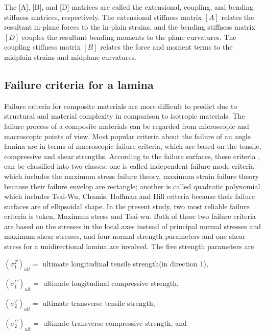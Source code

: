 The [A], [B], and [D] matrices are called the extensional, coupling, and bending stiffness matrices,
respectively. The extensional stiffness matrix $[A]$ relates the resultant in-plane forces to the
in-plain strains, and the bending stiffness matrix $[D]$ couples the resultant bending moments to
the plane curvatures.  The coupling stiffness matrix $[B]$ relates the force and moment terms to the
midplain strains and midplane curvatures.

\subsection{Failure criteria for a lamina}

Failure criteria for composite materials are more difficult to predict due to
structural and material complexity in comparison to isotropic materials. The
failure process of a composite materials can be regarded from microscopic and
macroscopic points of view. Most popular criteria about the failure of an angle
lamina are in terms of macroscopic failure criteria, which are based on the
tensile, compressive and shear strengths. According to the failure surfaces,
these criteria
\cite{massard1984computer,reddy1987first,fang1993design,soeiro1994multilevel,pelletier2006multi,jadhav2007parametric,omkar2008artificial,choudhury2019failure},
can be classified into two classes: one is called independent failure mode
criteria which includes the maximum stress failure
theory\cite{watkins1987multicriteria}, maximum strain failure theory because
their failure envelop are rectangle; another is called quadratic polynomial
which includes Tsai-Wu\cite{martin1987optimum,soares1995discrete}, Chamis,
Hoffman and Hill criteria because their failure surfaces are of ellipsoidal
shape. In the present study, two most reliable failure criteria is taken,
Maximum stress and Tsai-wu.  Both of these two failure criteria are based on
the stresses in the local axes instead of principal normal stresses and maximum
shear stresses, and four normal strength parameters and one shear stress for a
unidirectional lamina are involved. The five strength parameters are

$(\sigma _1^{T})_{ult}= $ ultimate longitudinal tensile strength(in direction 1),

$(\sigma _1^{C})_{ult}= $ ultimate longitudinal compressive strength,

$(\sigma _2^{T})_{ult}= $ ultimate transverse tensile strength,

$(\sigma _2^{C})_{ult}= $ ultimate transverse compressive strength, and

